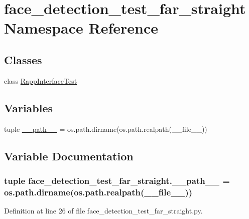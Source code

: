 \hypertarget{namespaceface__detection__test__far__straight}{\section{face\-\_\-detection\-\_\-test\-\_\-far\-\_\-straight Namespace Reference}
\label{namespaceface__detection__test__far__straight}
}
\subsection*{Classes}
\begin{DoxyCompactItemize}
\item 
class \hyperlink{classface__detection__test__far__straight_1_1RappInterfaceTest}{Rapp\-Interface\-Test}
\end{DoxyCompactItemize}
\subsection*{Variables}
\begin{DoxyCompactItemize}
\item 
tuple \hyperlink{namespaceface__detection__test__far__straight_ab9703eb9956ba6f4ce18a81b5e76e3af}{\-\_\-\-\_\-path\-\_\-\-\_\-} = os.\-path.\-dirname(os.\-path.\-realpath(\-\_\-\-\_\-file\-\_\-\-\_\-))
\end{DoxyCompactItemize}


\subsection{Variable Documentation}
\hypertarget{namespaceface__detection__test__far__straight_ab9703eb9956ba6f4ce18a81b5e76e3af}{
\subsubsection[{\-\_\-\-\_\-path\-\_\-\-\_\-}]{\setlength{\rightskip}{0pt plus 5cm}tuple face\-\_\-detection\-\_\-test\-\_\-far\-\_\-straight.\-\_\-\-\_\-path\-\_\-\-\_\- = os.\-path.\-dirname(os.\-path.\-realpath(\-\_\-\-\_\-file\-\_\-\-\_\-))}}\label{namespaceface__detection__test__far__straight_ab9703eb9956ba6f4ce18a81b5e76e3af}


Definition at line 26 of file face\-\_\-detection\-\_\-test\-\_\-far\-\_\-straight.\-py.

